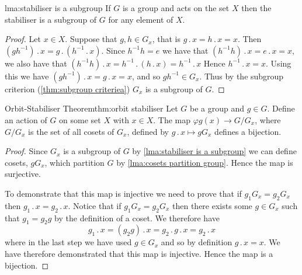 \documentclass[fleqn]{NotesClass}
\newcommand*{\action}{\mathbin{.}}
\newcommand{\orbit}{\mathit{g}}
\begin{document}
    \begin{lma}{}{lma:stabiliser is a subgroup}
        If \(G\) is a group and acts on the set \(X\) then the stabiliser is a subgroup of \(G\) for any element of \(X\).
        
        \begin{proof}
            Let \(x \in X\).
            Suppose that \(g, h \in G_x\), that is \(g\action x = h\action x = x\).
            Then \((gh^{-1})\action x = g\action (h^{-1} \action x)\).
            Since \(h^{-1}h = e\) we have that \((h^{-1}h)\action x = e\action x = x\), we also have that \((h^{-1}h)\action x = h^{-1}\action (h\action x) = h^{-1}\action x\) Hence \(h^{-1}\action x = x\).
            Using this we have \((gh^{-1}) \action x = g \action x = x\), and so \(gh^{-1} \in G_x\).
            Thus by the subgroup criterion (\cref{thm:subgroup criteriea}) \(G_x\) is a subgroup of \(G\).
        \end{proof}
    \end{lma}

    \begin{thm}{Orbit-Stabiliser Theorem}{thm:orbit stabiliser}
        Let \(G\) be a group and \(g \in G\).
        Define an action of \(G\) on some set \(X\) with \(x \in X\).
        The map \(\varphi \orbit(x) \to G/G_x\), where \(G/G_x\) is the set of all cosets of \(G_x\), defined by \(g\action x \mapsto gG_x\) defines a bijection.
        
        \begin{proof}
            Since \(G_x\) is a subgroup of \(G\) by \cref{lma:stabiliser is a subgroup} we can define cosets, \(gG_x\), which partition \(G\) by \cref{lma:cosets partition group}.
            Hence the map is surjective.
            
            To demonstrate that this map is injective we need to prove that if \(g_1G_x = g_2G_x\) then \(g_1\action x = g_2 \action x\).
            Notice that if \(g_1G_x = g_2G_x\) then there exists some \(g \in G_x\) such that \(g_1 = g_2g\) by the definition of a coset.
            We therefore have
            \begin{equation}
                g_1\action x = (g_2g)\action x = g_2\action g\action x = g_2 \action x
            \end{equation}
            where in the last step we have used \(g \in G_x\) and so by definition \(g\action x = x\).
            We have therefore demonstrated that this map is injective.
            Hence the map is a bijection.
        \end{proof}
    \end{thm}
    
\end{document}
